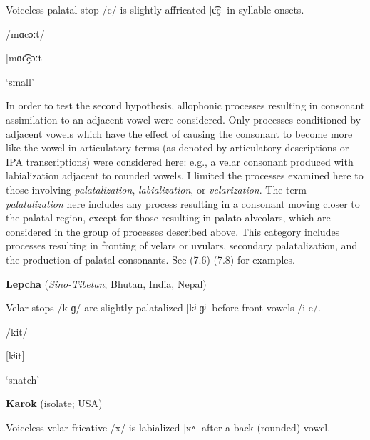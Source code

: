 Voiceless palatal stop /c/ is slightly affricated [c͡ç] in syllable onsets.



/mɑcɔːt/



[mɑc͡çɔːt]



‘small’



\citep[5]{Philips2007}
\z



  In order to test the second hypothesis, allophonic processes resulting in consonant assimilation to an adjacent vowel were considered. Only processes conditioned by adjacent vowels which have the effect of causing the consonant to become more like the vowel in articulatory terms (as denoted by articulatory descriptions or IPA transcriptions) were considered here: e.g., a velar consonant produced with labialization adjacent to rounded vowels. I limited the processes examined here to those involving \textit{palatalization}, \textit{labialization}, or \textit{velarization}. The term \textit{palatalization} here includes any process resulting in a consonant moving closer to the palatal region, except for those resulting in palato-alveolars, which are considered in the group of processes described above. This category includes processes resulting in fronting of velars or uvulars, secondary palatalization, and the production of palatal consonants. See (7.6)-(7.8) for examples.



\ea\label{ex:(7.6)}
  \textbf{Lepcha} (\textit{Sino-Tibetan}; Bhutan, India, Nepal)



Velar stops /k ɡ/ are slightly palatalized [kʲ ɡʲ] before front vowels /i e/.



/kit/



[kʲit]



‘snatch’



\citep[21]{Plaisier2007}


\z

\ea\label{ex:(7.7)}
  \textbf{Karok} (isolate; USA)



Voiceless velar fricative /x/ is labialized [xʷ] after a back (rounded) vowel.



